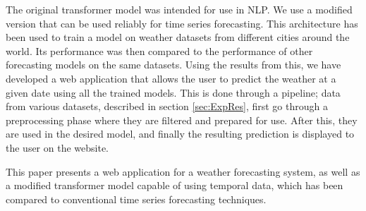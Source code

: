 The original transformer model was intended for use in NLP.
We use a modified version that can be used reliably for time series forecasting.
This architecture has been used to train a model on weather datasets from different cities around the world.
Its performance was then compared to the performance of other forecasting models on the same datasets. 
Using the results from this, we have developed a web application that allows the user to predict the weather at a given date using all the trained models.
This is done through a pipeline; data from various datasets, described in section \ref{sec:ExpRes}, first go through a preprocessing phase where they are filtered and prepared for use.
After this, they are used in the desired model, and finally the resulting prediction is displayed to the user on the website.  

This paper presents a web application for a weather forecasting system, as well as a modified transformer model capable of using temporal data, which has been compared to conventional time series forecasting techniques.